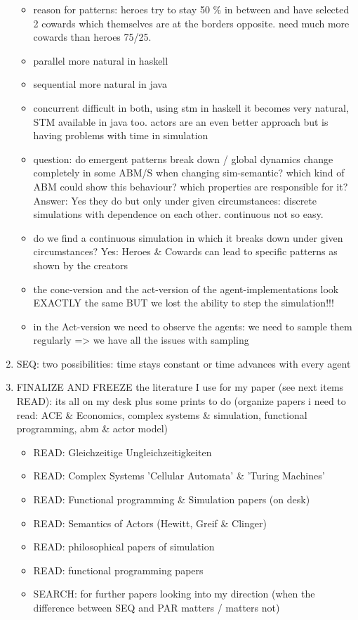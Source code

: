 \begin{enumerate}
\begin{itemize}
		\item reason for patterns: heroes try to stay 50 \% in between and have selected 2 cowards which themselves are at the borders opposite. need much more cowards than heroes 75/25.
		
		\item parallel more natural in haskell
		\item sequential more natural in java
		\item concurrent difficult in both, using stm in haskell it becomes very natural, STM available in java too. actors are an even better approach but is having problems with time in simulation
		
		\item question: do emergent patterns break down / global dynamics change completely in some ABM/S when changing sim-semantic? which kind of ABM could show this behaviour? which properties are responsible for it? Answer: Yes they do but only under given circumstances: discrete simulations with dependence on each other. continuous not so easy. 
		
		\item do we find a continuous simulation in which it breaks down under given circumstances? Yes: Heroes \& Cowards can lead to specific patterns as shown by the creators
	
		\item the conc-version and the act-version of the agent-implementations look EXACTLY the same	 BUT we lost the ability to step the simulation!!!
		
		\item in the Act-version we need to observe the agents: we need to sample them regularly => we have all the issues with sampling 
	\end{itemize}
	
\item SEQ: two possibilities: time stays constant or time advances with every agent

\item FINALIZE AND FREEZE the literature I use for my paper (see next items READ): its all on my desk plus some prints to do (organize papers i need to read: ACE \& Economics, complex systems \& simulation, functional programming, abm \& actor model)
	\begin{itemize}
		\item READ: Gleichzeitige Ungleichzeitigkeiten
		\item READ: Complex Systems 'Cellular Automata' \& 'Turing Machines'
		\item READ: Functional programming \& Simulation papers (on desk)
		\item READ: Semantics of Actors (Hewitt, Greif \& Clinger)
		\item READ: philosophical papers of simulation
		\item READ: functional programming papers
		\item SEARCH: for further papers looking into my direction (when the difference between SEQ and PAR matters / matters not)
	\end{itemize}


\end{enumerate}
